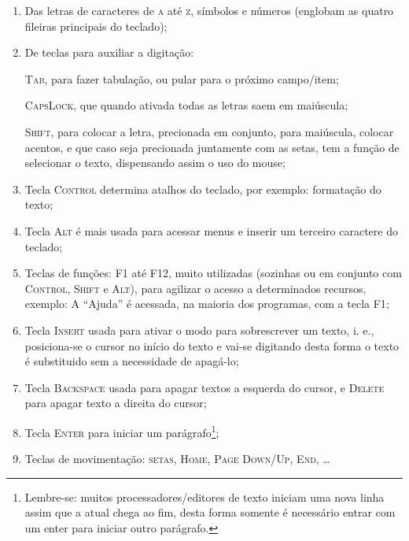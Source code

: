 \documentclass[12pt,a4]{book}
\begin{document}
\begin{enumerate}
\item Das letras de caracteres de \textsc{a} até \textsc{z}, símbolos e
números (englobam as quatro fileiras principais do teclado);
\item De teclas para auxiliar a digitação:

\textsc{Tab}, para fazer tabulação, ou pular para o próximo campo/item;

\textsc{CapsLock}, que quando ativada todas as letras saem em maiúscula;

\textsc{Shift}, para colocar a letra, precionada em conjunto, para maiúscula,
colocar acentos, e que caso seja precionada juntamente com as setas, tem a
função de selecionar o texto, dispensando assim o uso do mouse;

\item Tecla \textsc{Control} determina atalhos do teclado, por exemplo:
formatação do texto;

\item Tecla \textsc{Alt} é mais usada para acessar menus e inserir um terceiro
caractere do teclado;

\item Teclas de funções: \textsc{F1} até \textsc{F12}, muito utilizadas
(sozinhas ou em conjunto com \textsc{Control}, \textsc{Shift} e \textsc{Alt}),
para agilizar o acesso a determinados recursos, exemplo: A ``Ajuda'' é
acessada, na maioria dos programas, com a tecla \textsc{F1};

\item Tecla \textsc{Insert} usada para ativar o modo para sobrescrever um
texto, i. e., posiciona-se o cursor no início do texto e vai-se digitando desta
forma o texto é substituido sem a necessidade de apagá-lo;

\item Tecla \textsc{Backspace} usada para apagar textos a esquerda do cursor, e
\textsc{Delete} para apagar texto a direita do cursor;

\item Tecla \textsc{Enter} para iniciar um parágrafo\footnote{Lembre-se:
muitos processadores/editores de texto iniciam uma nova linha assim que a atual
chega ao fim, desta forma somente é necessário entrar com um enter para
iniciar outro parágrafo.};

\item Teclas de movimentação: \textsc{setas}, \textsc{Home},
\textsc{Page Down/Up}, \textsc{End}, \ldots

\end{enumerate}
\end{document}
